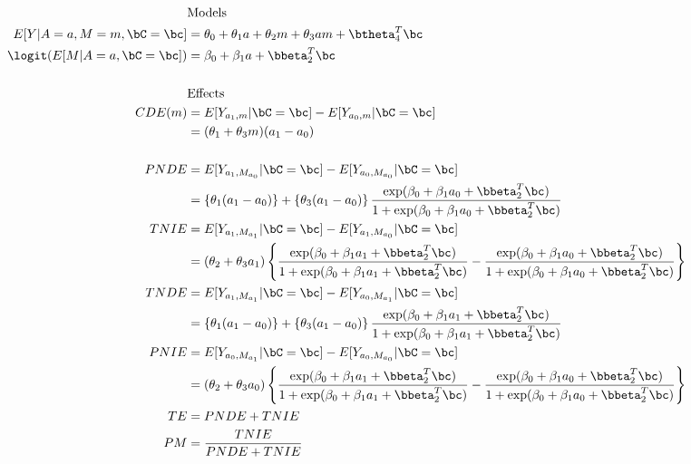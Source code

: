 \documentclass[dvipdfmx,10pt]{article}
\begin{document}
\begin{align*}
  &\text{Models}\\
  E[Y|A=a,M=m,\bC=\bc] &= \theta_{0} + \theta_{1}a + \theta_{2}m + \theta_{3}am + \btheta_{4}^{T}\bc\\
  \logit(E[M|A=a,\bC=\bc]) &= \beta_{0} + \beta_{1}a + \bbeta_{2}^{T}\bc\\
  \\
  &\text{Effects}\\
  CDE(m) &= E[Y_{a_{1},m} | \bC = \bc] - E[Y_{a_{0},m} | \bC = \bc]\\
  &= (\theta_{1} + \theta_{3}m)(a_{1} - a_{0})\\
  \\
  PNDE &= E[Y_{a_{1},M_{a_{0}}} | \bC = \bc] - E[Y_{a_{0},M_{a_{0}}} | \bC = \bc]\\
  &= \left\{\theta_{1}(a_{1} - a_{0}) \right\} + \left\{\theta_{3}(a_{1} - a_{0}) \right\}
    \frac
    {\exp(\beta_{0} + \beta_{1}a_{0} + \bbeta_{2}^{T}\bc)}
    {1 + \exp(\beta_{0} + \beta_{1}a_{0} + \bbeta_{2}^{T}\bc)}\\
  TNIE &= E[Y_{a_{1},M_{a_{1}}} | \bC = \bc] - E[Y_{a_{1},M_{a_{0}}} | \bC = \bc]\\
  &= (\theta_{2} + \theta_{3}a_{1})\left\{
    \frac
    {\exp(\beta_{0} + \beta_{1}a_{1} + \bbeta_{2}^{T}\bc)}
    {1 + \exp(\beta_{0} + \beta_{1}a_{1} + \bbeta_{2}^{T}\bc)}
    -
    \frac
    {\exp(\beta_{0} + \beta_{1}a_{0} + \bbeta_{2}^{T}\bc)}
    {1 + \exp(\beta_{0} + \beta_{1}a_{0} + \bbeta_{2}^{T}\bc)}
    \right\}
  \\
  TNDE &= E[Y_{a_{1},M_{a_{1}}} | \bC = \bc] - E[Y_{a_{0},M_{a_{1}}} | \bC = \bc]\\
  &= \left\{\theta_{1}(a_{1} - a_{0}) \right\} + \left\{\theta_{3}(a_{1} - a_{0}) \right\}
    \frac
    {\exp(\beta_{0} + \beta_{1}a_{1} + \bbeta_{2}^{T}\bc)}
    {1 + \exp(\beta_{0} + \beta_{1}a_{1} + \bbeta_{2}^{T}\bc)}\\
  PNIE &= E[Y_{a_{0},M_{a_{1}}} | \bC = \bc] - E[Y_{a_{0},M_{a_{0}}} | \bC = \bc]\\
  &= (\theta_{2} + \theta_{3}a_{0})\left\{
    \frac
    {\exp(\beta_{0} + \beta_{1}a_{1} + \bbeta_{2}^{T}\bc)}
    {1 + \exp(\beta_{0} + \beta_{1}a_{1} + \bbeta_{2}^{T}\bc)}
    -
    \frac
    {\exp(\beta_{0} + \beta_{1}a_{0} + \bbeta_{2}^{T}\bc)}
    {1 + \exp(\beta_{0} + \beta_{1}a_{0} + \bbeta_{2}^{T}\bc)}
    \right\}
  \\
  TE &= PNDE + TNIE\\
  PM &= \frac{TNIE}{PNDE + TNIE}\\
\end{align*}
\end{document}
